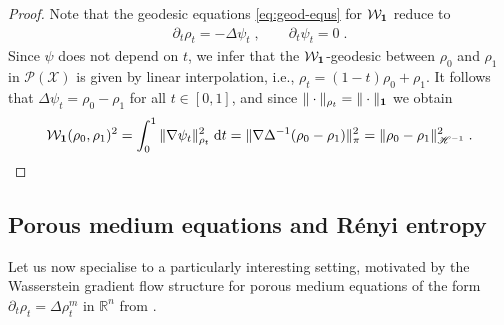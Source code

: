 \documentclass[a4paper,11pt,reqno]{amsart}
\theoremstyle{plain}
\theoremstyle{remark}
\numberwithin{equation}{section}
\begin{document}
\begin{proof}
  Note that the geodesic equations \eqref{eq:geod-equs} for ${\mathcal{W}}_{{{\bf 1}}}$
  reduce to
\begin{align*}
 \partial_t \rho_t = - \Delta \psi_t\;, \qquad
 \partial_t \psi_t = 0\;.
\end{align*}
Since $\psi$ does not depend on $t$, we infer that the
${\mathcal{W}}_{{{\bf 1}}}$-geodesic between $\rho_0$ and $\rho_1$ in ${{\mathscr{P}}({\mathcal{X}})}$ is given by
linear interpolation, i.e., $\rho_t = (1-t) \rho_0 + \rho_1$.  It
follows that $\Delta\psi_t = \rho_0 - \rho_1$ for all $t \in [0,1]$,
and since $\| \cdot \|_{\rho_t} = \| \cdot\|_{{{\bf 1}}}$ we obtain
\begin{align*}
 {\mathcal{W}}_{{{\bf 1}}}(\rho_0, \rho_1)^2 
    = \int_0^1 \| \nabla \psi_t \|_{\rho_t}^2 {\; \mathrm{d}} t
    = \| \nabla \Delta^{-1}(\rho_0 - \rho_1) \|_{\pi}^2
    =  \| \rho_0 - \rho_1 \|_{{\mathscr{H}}^{-1}}^2\;.
\end{align*}
\end{proof}

\subsection{Porous medium equations and R\'enyi entropy}
\label{sec:Potenzmittel}
Let us now specialise to a particularly interesting setting, motivated
by the Wasserstein gradient flow structure for porous medium equations
of the form $\partial_t \rho_t= \Delta \rho_t^m$ in ${{\mathbb R}}^n$ from
\cite{O01}.
\end{document}
